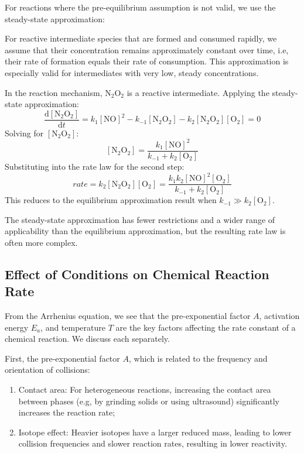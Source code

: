 For reactions where the pre-equilibrium assumption is not valid, we use the steady-state approximation:

\begin{proposition}
For reactive intermediate species that are formed and consumed rapidly, we assume that their concentration remains approximately constant over time, i.e, their rate of formation equals their rate of consumption. This approximation is especially valid for intermediates with very low, steady concentrations.
\end{proposition}

\begin{example}
In the reaction mechanism, $\text{N}_2\text{O}_2$ is a reactive intermediate. Applying the steady-state approximation:
$$\frac{\mathrm{d}[\text{N}_2\text{O}_2]}{\mathrm{d}t} = k_1[\text{NO}]^2 - k_{-1}[\text{N}_2\text{O}_2] - k_2[\text{N}_2\text{O}_2][\text{O}_2] = 0$$
Solving for $[\text{N}_2\text{O}_2]$:
$$[\text{N}_2\text{O}_2] = \frac{k_1[\text{NO}]^2}{k_{-1} + k_2[\text{O}_2]}$$
Substituting into the rate law for the second step:
$$rate = k_2[\text{N}_2\text{O}_2][\text{O}_2] = \frac{k_1k_2[\text{NO}]^2[\text{O}_2]}{k_{-1} + k_2[\text{O}_2]}$$
This reduces to the equilibrium approximation result when $k_{-1} \gg k_2[\text{O}_2]$.
\end{example}

The steady-state approximation has fewer restrictions and a wider range of applicability than the equilibrium approximation, but the resulting rate law is often more complex.

\subsection{Effect of Conditions on Chemical Reaction Rate}

From the Arrhenius equation, we see that the pre-exponential factor $A$, activation energy $E_a$, and temperature $T$ are the key factors affecting the rate constant of a chemical reaction. We discuss each separately.

First, the pre-exponential factor $A$, which is related to the frequency and orientation of collisions:

\begin{proposition}
  \begin{enumerate}
    \item Contact area: For heterogeneous reactions, increasing the contact area between phases (e.g, by grinding solids or using ultrasound) significantly increases the reaction rate;
    \item Isotope effect: Heavier isotopes have a larger reduced mass, leading to lower collision frequencies and slower reaction rates, resulting in lower reactivity.
  \end{enumerate}
\end{proposition}

